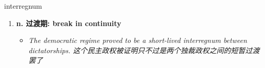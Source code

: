 
\begin{frame}
{\huge interregnum}
\begin{center}
\begin{enumerate}\Large
  \item \textbf{n. 过渡期: break in continuity}
  \begin{itemize}
    \item \em{\Large{The democratic regime proved to be a short-lived interregnum between dictatorships. 这个民主政权被证明只不过是两个独裁政权之间的短暂过渡罢了}}
  \end{itemize}
\end{enumerate}
\end{center}
\end{frame}
